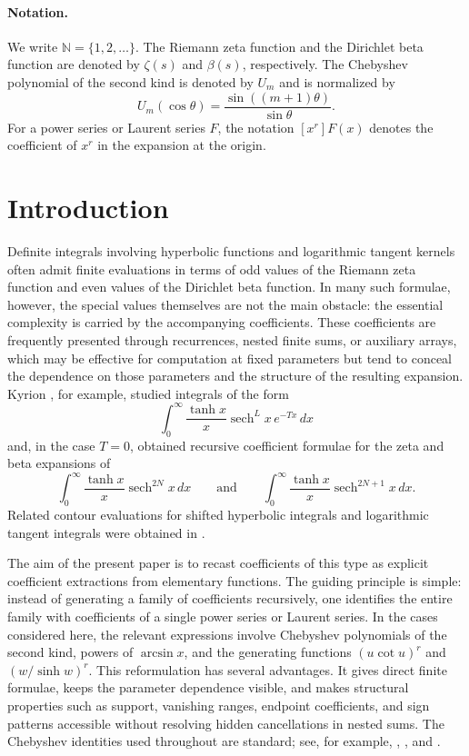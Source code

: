 \documentclass[11pt,twoside]{article}
\DeclareMathOperator{\sech}{sech}
\numberwithin{equation}{section}
\begin{document}
\paragraph{Notation.}
We write \(\mathbb N=\{1,2,\ldots\}\).  The Riemann zeta function and the
Dirichlet beta function are denoted by \(\zeta(s)\) and \(\beta(s)\),
respectively.  The Chebyshev polynomial of the second kind \cite{MasonHandscomb2003}
\cite{Mason1993}\cite{Rivlin1990}
\cite{NIST:DLMF} is denoted by
\(U_m\) and is normalized by
\[
U_m(\cos\theta)=\frac{\sin((m+1)\theta)}{\sin\theta}.
\]
For a power series or Laurent series \(F\), the notation \([x^r]F(x)\)
denotes the coefficient of \(x^r\) in the expansion at the origin.

\vspace{0.5cm}

\section*{Introduction}

Definite integrals involving hyperbolic functions and logarithmic tangent
kernels often admit finite evaluations in terms of odd values of the Riemann
zeta function and even values of the Dirichlet beta function.  In many such
formulae, however, the special values themselves are not the main obstacle:
the essential complexity is carried by the accompanying coefficients.  These
coefficients are frequently presented through recurrences, nested finite sums,
or auxiliary arrays, which may be effective for computation at fixed
parameters but tend to conceal the dependence on those parameters and the
structure of the resulting expansion.  Kyrion \cite{Kyrion2025}, for example,
studied integrals of the form
\[
\int_0^\infty \frac{\tanh x}{x}\sech^L x\,e^{-Tx}\,dx
\]
and, in the case \(T=0\), obtained recursive coefficient formulae for the
zeta and beta expansions of
\[
\int_0^\infty \frac{\tanh x}{x}\sech^{2N}x\,dx
\qquad\text{and}\qquad
\int_0^\infty \frac{\tanh x}{x}\sech^{2N+1}x\,dx.
\]
Related contour evaluations for shifted hyperbolic integrals and logarithmic
tangent integrals were obtained in \cite{talla_waffo_integral_2025}.

\vspace{0.1cm}

The aim of the present paper is to recast coefficients of this type as
explicit coefficient extractions from elementary functions.  The guiding
principle is simple: instead of generating a family of coefficients
recursively, one identifies the entire family with coefficients of a single
power series or Laurent series.  In the cases considered here, the relevant
expressions involve Chebyshev polynomials of the second kind, powers of
\(\arcsin x\), and the generating functions \((u\cot u)^r\) and
\((w/\sinh w)^r\).  This reformulation has several advantages.  It gives
direct finite formulae, keeps the parameter dependence visible, and makes
structural properties such as support, vanishing ranges, endpoint
coefficients, and sign patterns accessible without resolving hidden
cancellations in nested sums.  The Chebyshev identities used throughout are
standard; see, for example, \cite[Section~4.6]{MasonHandscomb2003},
\cite{Mason1993,Rivlin1990}, and \cite[Chapter~18]{NIST:DLMF}.
\end{document}
